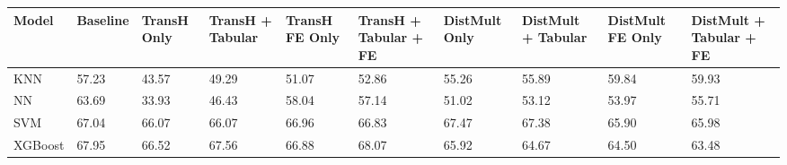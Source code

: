 \begin{tabular}{llllllllll}
\toprule
Model & Baseline & TransH Only & TransH + Tabular & TransH FE Only & TransH + Tabular + FE & DistMult Only & DistMult + Tabular & DistMult FE Only & DistMult + Tabular + FE \\
\midrule
KNN & 57.23 & 43.57 & 49.29 & 51.07 & 52.86 & 55.26 & 55.89 & 59.84 & 59.93 \\
NN & 63.69 & 33.93 & 46.43 & 58.04 & 57.14 & 51.02 & 53.12 & 53.97 & 55.71 \\
SVM & 67.04 & 66.07 & 66.07 & 66.96 & 66.83 & 67.47 & 67.38 & 65.90 & 65.98 \\
XGBoost & 67.95 & 66.52 & 67.56 & 66.88 & 68.07 & 65.92 & 64.67 & 64.50 & 63.48 \\
\bottomrule
\end{tabular}
